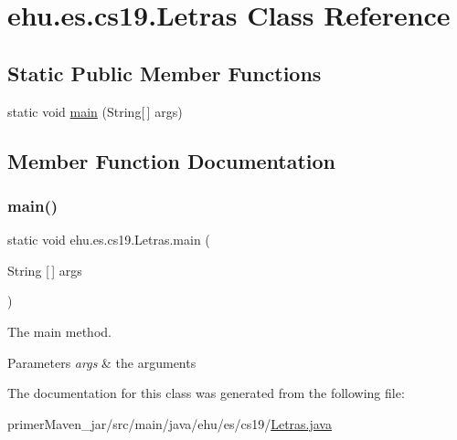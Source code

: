 \hypertarget{classehu_1_1es_1_1cs19_1_1_letras}{}\section{ehu.\+es.\+cs19.\+Letras Class Reference}
\label{classehu_1_1es_1_1cs19_1_1_letras}
\subsection*{Static Public Member Functions}
\begin{DoxyCompactItemize}
\item 
static void \mbox{\hyperlink{classehu_1_1es_1_1cs19_1_1_letras_af7b863a1cc34ef914afc805be7a26aae}{main}} (String\mbox{[}$\,$\mbox{]} args)
\end{DoxyCompactItemize}


\subsection{Member Function Documentation}
\mbox{\label{classehu_1_1es_1_1cs19_1_1_letras_af7b863a1cc34ef914afc805be7a26aae}} 
\subsubsection{\texorpdfstring{main()}{main()}}
{\footnotesize\ttfamily static void ehu.\+es.\+cs19.\+Letras.\+main (\begin{DoxyParamCaption}\item[{String \mbox{[}$\,$\mbox{]}}]{args }\end{DoxyParamCaption})\hspace{0.3cm}{\ttfamily [static]}}

The main method.


\begin{DoxyParams}{Parameters}
{\em args} & the arguments \\
\hline
\end{DoxyParams}


The documentation for this class was generated from the following file\+:\begin{DoxyCompactItemize}
\item 
primer\+Maven\+\_\+jar/src/main/java/ehu/es/cs19/\mbox{\hyperlink{_letras_8java}{Letras.\+java}}\end{DoxyCompactItemize}

